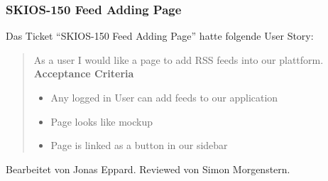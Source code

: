 \subsubsection{SKIOS-150 Feed Adding Page} \label{story:150}
Das Ticket \enquote{SKIOS-150 Feed Adding Page} hatte folgende User Story:
\begin{quotation}
    As a user I would like a page to add RSS feeds into our plattform.
\textbf{Acceptance Criteria}
\begin{itemize}
    \item Any logged in User can add feeds to our application
    \item Page looks like mockup
    \item Page is linked as a button in our sidebar
\end{itemize}
\end{quotation}
Bearbeitet von Jonas Eppard.
Reviewed von Simon Morgenstern.

